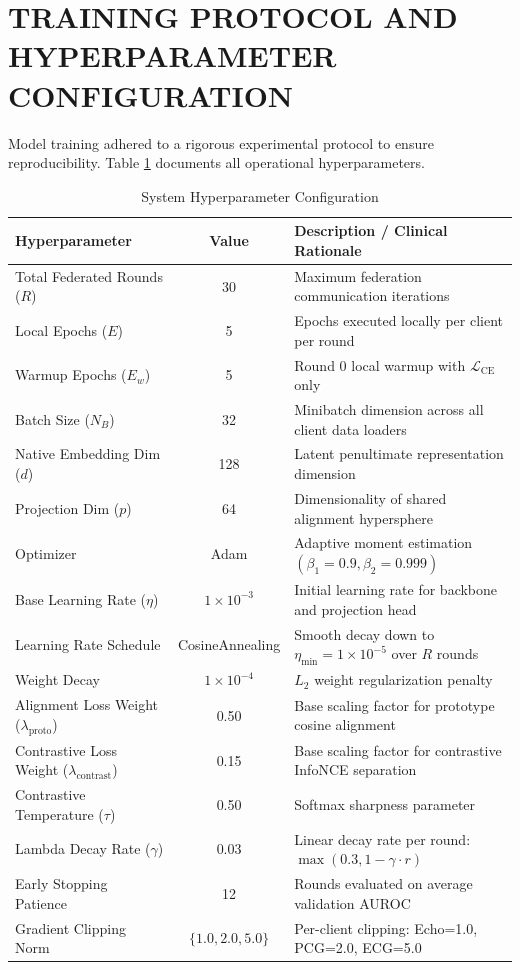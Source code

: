 \documentclass[12pt,a4paper]{amritareport}
\begin{document}
\section{TRAINING PROTOCOL AND HYPERPARAMETER CONFIGURATION}

Model training adhered to a rigorous experimental protocol to ensure reproducibility. Table \ref{tab:hyperparams} documents all operational hyperparameters.

\begin{table}[htbp]
	\centering
	\caption{System Hyperparameter Configuration}
	\label{tab:hyperparams}
	\begin{tabular}{|l|c|l|}
		\hline
		\textbf{Hyperparameter} & \textbf{Value} & \textbf{Description / Clinical Rationale} \\
		\hline
		Total Federated Rounds ($R$) & 30 & Maximum federation communication iterations \\
		Local Epochs ($E$) & 5 & Epochs executed locally per client per round \\
		Warmup Epochs ($E_w$) & 5 & Round 0 local warmup with $\mathcal{L}_{\text{CE}}$ only \\
		Batch Size ($N_B$) & 32 & Minibatch dimension across all client data loaders \\
		Native Embedding Dim ($d$) & 128 & Latent penultimate representation dimension \\
		Projection Dim ($p$) & 64 & Dimensionality of shared alignment hypersphere \\
		Optimizer & Adam & Adaptive moment estimation $(\beta_1=0.9, \beta_2=0.999)$ \\
		Base Learning Rate ($\eta$) & $1 \times 10^{-3}$ & Initial learning rate for backbone and projection head \\
		Learning Rate Schedule & CosineAnnealing & Smooth decay down to $\eta_{\text{min}} = 1 \times 10^{-5}$ over $R$ rounds \\
		Weight Decay & $1 \times 10^{-4}$ & $L_2$ weight regularization penalty \\
		Alignment Loss Weight ($\lambda_{\text{proto}}$) & 0.50 & Base scaling factor for prototype cosine alignment \\
		Contrastive Loss Weight ($\lambda_{\text{contrast}}$) & 0.15 & Base scaling factor for contrastive InfoNCE separation \\
		Contrastive Temperature ($\tau$) & 0.50 & Softmax sharpness parameter \\
		Lambda Decay Rate ($\gamma$) & 0.03 & Linear decay rate per round: $\max(0.3, 1 - \gamma \cdot r)$ \\
		Early Stopping Patience & 12 & Rounds evaluated on average validation AUROC \\
		Gradient Clipping Norm & $\{1.0, 2.0, 5.0\}$ & Per-client clipping: Echo=1.0, PCG=2.0, ECG=5.0 \\
		\hline
	\end{tabular}
\end{table}
\end{document}

